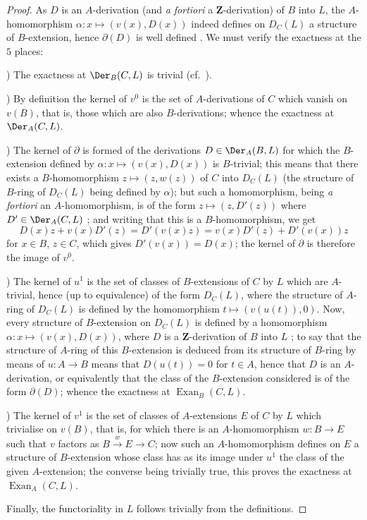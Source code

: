\begin{proof}
As $D$ is an $A$-derivation (and \emph{a fortiori} a $\mathbf{Z}$-derivation) of $B$ into $L$, the $A$-homomorphism $\alpha:x\mapsto(v(x),D(x))$ indeed defines on $D_C(L)$ a structure of $B$-extension, hence $\partial(D)$ is well defined .
We must verify the exactness at the $5$ places:

\medskip
{})\enspace
The exactness at $\Der_B(C,L)$ is trivial (cf.\ ).

\medskip
{})\enspace
By definition  the kernel of $v^0$ is the set of $A$-derivations of $C$ which vanish on $v(B)$, that is, those which are also $B$-derivations; whence the exactness at $\Der_A(C,L)$.

\medskip
{})\enspace
The kernel of $\partial$ is formed of the derivations $D\in\Der_A(B,L)$ for which the $B$-extension defined by $\alpha:x\mapsto(v(x),D(x))$ is $B$-trivial; this means  that there exists a $B$-homomorphism $z\mapsto(z,w(z))$ of $C$ into $D_C(L)$ (the structure of $B$-ring of $D_C(L)$ being defined by $\alpha$); but such a homomorphism, being \emph{a fortiori} an $A$-homomorphism, is of the form $z\mapsto(z,D'(z))$ where $D'\in\Der_A(C,L)$ ; and writing that this is a $B$-homomorphism, we get
\[
  D(x)z+v(x)D'(z) = D'(v(x)z) = v(x)D'(z)+D'(v(x))z
\]
for $x\in B$, $z\in C$, which gives $D'(v(x))=D(x)$; the kernel of $\partial$ is therefore the image of $v^0$.

\medskip
{})\enspace
The kernel of $u^1$ is the set of classes of $B$-extensions of $C$ by $L$ which are $A$-trivial, hence (up to equivalence) of the form $D_C(L)$, where the structure of $A$-ring of $D_C(L)$ is defined by the homomorphism $t\mapsto(v(u(t)),0)$.
Now, every structure of $B$-extension on $D_C(L)$ is defined by a homomorphism $\alpha:x\mapsto(v(x),D(x))$, where $D$ is a $\mathbf{Z}$-derivation of $B$ into $L$ ; to say that the structure of $A$-ring of this $B$-extension is deduced from its structure of $B$-ring by means of $u:A\to B$ means that $D(u(t))=0$ for $t\in A$, hence that $D$ is an $A$-derivation, or equivalently that the class of the $B$-extension considered is of the form $\partial(D)$; whence the exactness at $\operatorname{Exan}_B(C,L)$.

\medskip
{})\enspace
The kernel of $v^1$ is the set of classes of $A$-extensions $E$ of $C$ by $L$ which trivialise on $v(B)$, that is, for which there is an $A$-homomorphism $w:B\to E$ such that $v$ factors as $B\xrightarrow{w}E\to C$; now such an $A$-homomorphism defines on $E$ a structure of $B$-extension whose class has as its image under $u^1$ the class of the given $A$-extension; the converse being trivially true, this proves the exactness at $\operatorname{Exan}_A(C,L)$.

Finally, the functoriality in $L$ follows trivially from the definitions.
\end{proof}

